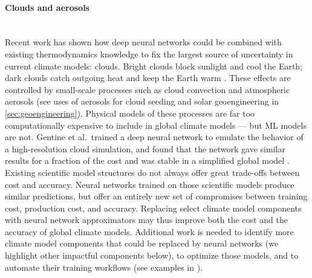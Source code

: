\documentclass[11pt]{report}
\newcommand{\Gap}{\texorpdfstring{\hfill}{}}
\newcommand{\Rec}{\texorpdfstring{{\small\emph{\color{blue}{\fbox{High Leverage}}}}}{}}
\begin{document}
\paragraph*{Clouds and aerosols}\Gap\textbf{\Rec}\mbox{}\\
Recent work has shown how deep neural networks could be combined with existing thermodynamics knowledge to fix the largest source of uncertainty in current climate models: clouds. Bright clouds block sunlight and cool the Earth; dark clouds catch outgoing heat and keep the Earth warm \cite{IPCC2014, Sherwood2014}. These effects are controlled by small-scale processes such as cloud convection and atmospheric aerosols (see uses of aerosols for cloud seeding and solar geoengineering in \textsection\ref{sec:geoengineering}). Physical models of these processes are far too computationally expensive to include in global climate models --- but ML models are not. Gentine et al.~trained a deep neural network to emulate the behavior of a high-resolution cloud simulation, and found that the network gave similar results for a fraction of the cost \cite{Gentine2018} and was stable in a simplified global model \cite{Rasp2018}. Existing scientific model structures do not always offer great trade-offs between cost and accuracy. Neural networks trained on those scientific models produce similar predictions, but offer an entirely new set of compromises between training cost, production cost, and accuracy. Replacing select climate model components with neural network approximators may thus improve both the cost and the accuracy of global climate models. Additional work is needed to identify more climate model components that could be replaced by neural networks (we highlight other impactful components below), to optimize those models, and to automate their training workflows (see examples in \cite{Reichstein2019}).
\end{document}
